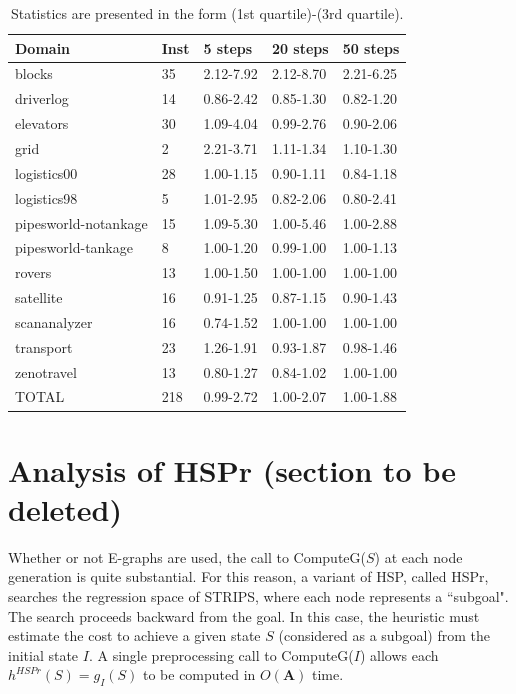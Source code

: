 \documentclass[letterpaper]{article}
\begin{document}
\begin{table}
	\begin{center}
	    \begin{tabular}{| l | l | l | l | l |}
	    \hline
	    Domain & Inst & 5 steps & 20 steps & 50 steps
	    \\ \hline
	    blocks & 35 & 2.12-7.92 & 2.12-8.70 & 2.21-6.25
	    \\ \hline
	    driverlog & 14 & 0.86-2.42 & 0.85-1.30 & 0.82-1.20
	    \\ \hline
	    elevators & 30 & 1.09-4.04 & 0.99-2.76 & 0.90-2.06
	    \\ \hline
	    grid & 2 & 2.21-3.71 & 1.11-1.34 & 1.10-1.30
	    \\ \hline
	    logistics00 & 28 & 1.00-1.15 & 0.90-1.11 & 0.84-1.18
	    \\ \hline
	    logistics98 & 5 & 1.01-2.95 & 0.82-2.06 & 0.80-2.41
	    \\ \hline
	    pipesworld-notankage & 15 & 1.09-5.30 & 1.00-5.46 & 1.00-2.88
	    \\ \hline
	    pipesworld-tankage & 8 & 1.00-1.20 & 0.99-1.00 & 1.00-1.13
	    \\ \hline
	    rovers & 13 & 1.00-1.50 & 1.00-1.00 & 1.00-1.00
	    \\ \hline
	    satellite & 16 & 0.91-1.25 & 0.87-1.15 & 0.90-1.43
	    \\ \hline
	    scananalyzer & 16 & 0.74-1.52 & 1.00-1.00 & 1.00-1.00
	    \\ \hline
	    transport & 23 & 1.26-1.91 & 0.93-1.87 & 0.98-1.46
	    \\ \hline
	    zenotravel & 13 & 0.80-1.27 & 0.84-1.02 & 1.00-1.00
	    \\ \hline
	    TOTAL & 218 & 0.99-2.72 & 1.00-2.07 & 1.00-1.88
	    \\ \hline
	    \end{tabular}
	\end{center}
	\caption{Statistics are presented in the form (1st quartile)-(3rd quartile).}
	 \label{tab:walk}
\end{table}

\section{Analysis of HSPr (section to be deleted)}

Whether or not E-graphs are used, the call to ComputeG($S$) at each node generation is quite substantial. For this reason, a variant of HSP, called HSPr, searches the regression space of STRIPS, where each node represents a ``subgoal". The search proceeds backward from the goal. In this case, the heuristic must estimate the cost to achieve a given state $S$ (considered as a subgoal) from the initial state $I$. A single preprocessing call to ComputeG($I$) allows each $h^{HSPr}(S) = g_I(S)$ to be computed in $O(\mathbf{A})$ time.
\end{document}
